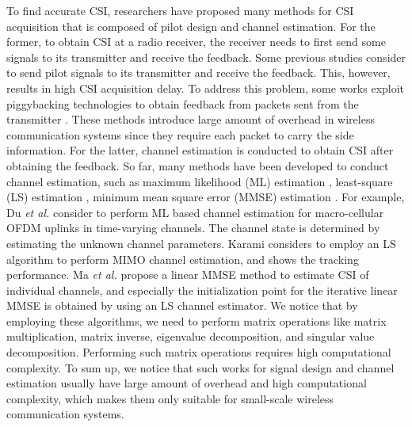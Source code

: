 \documentclass[10pt,journal,cspaper,compsoc]{IEEEtran}
\begin{document}
To find accurate CSI, researchers have proposed many methods for CSI acquisition that is composed of pilot design \cite{QYWN14} and channel estimation. For the former, to obtain CSI at a radio receiver, the receiver needs to first send some signals to its transmitter and receive the feedback. Some previous studies \cite{} consider to send pilot signals to its transmitter and receive the feedback. This, however, results in high CSI acquisition delay. To address this problem, some works exploit piggybacking technologies to obtain feedback from packets sent from the transmitter \cite{}. These methods introduce large amount of overhead in wireless communication systems since they require each packet to carry the side information. For the latter, channel estimation is conducted to obtain CSI after obtaining the feedback. So far, many methods have been developed to conduct channel estimation, such as maximum likelihood (ML) estimation \cite{}, least-square (LS) estimation \cite{}, minimum mean square error (MMSE) estimation \cite{}. For example, Du \emph{et al.} \cite{DSCB11} consider to perform ML based channel estimation for macro-cellular OFDM uplinks in time-varying channels. The channel state is determined by estimating the unknown channel parameters. Karami \cite{Kar07} considers to employ an LS algorithm to perform MIMO channel estimation, and shows the tracking performance. Ma \emph{et al.} \cite{MZLZ17} propose a linear MMSE method to estimate CSI of individual channels, and especially the initialization point for the iterative linear MMSE is obtained by using an LS channel estimator. We notice that by employing these algorithms, we need to perform matrix operations like matrix multiplication, matrix inverse, eigenvalue decomposition, and singular value decomposition. Performing such matrix operations requires high computational complexity. To sum up, we notice that such works for signal design and channel estimation usually have large amount of overhead and high computational complexity, which makes them only suitable for small-scale wireless communication systems.
\end{document}
